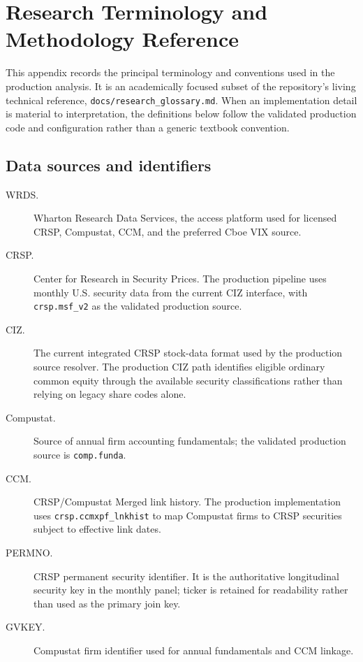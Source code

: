 \section{Research Terminology and Methodology Reference}
\label{app:terminology}

This appendix records the principal terminology and conventions used in the production analysis. It is an academically focused subset of the repository's living technical reference, \texttt{docs/research\_glossary.md}. When an implementation detail is material to interpretation, the definitions below follow the validated production code and configuration rather than a generic textbook convention.

\subsection{Data sources and identifiers}

\begin{description}
\item[WRDS.] Wharton Research Data Services, the access platform used for licensed CRSP, Compustat, CCM, and the preferred Cboe VIX source.
\item[CRSP.] Center for Research in Security Prices. The production pipeline uses monthly U.S. security data from the current CIZ interface, with \texttt{crsp.msf\_v2} as the validated production source.
\item[CIZ.] The current integrated CRSP stock-data format used by the production source resolver. The production CIZ path identifies eligible ordinary common equity through the available security classifications rather than relying on legacy share codes alone.
\item[Compustat.] Source of annual firm accounting fundamentals; the validated production source is \texttt{comp.funda}.
\item[CCM.] CRSP/Compustat Merged link history. The production implementation uses \texttt{crsp.ccmxpf\_lnkhist} to map Compustat firms to CRSP securities subject to effective link dates.
\item[PERMNO.] CRSP permanent security identifier. It is the authoritative longitudinal security key in the monthly panel; ticker is retained for readability rather than used as the primary join key.
\item[GVKEY.] Compustat firm identifier used for annual fundamentals and CCM linkage.
\end{description}

